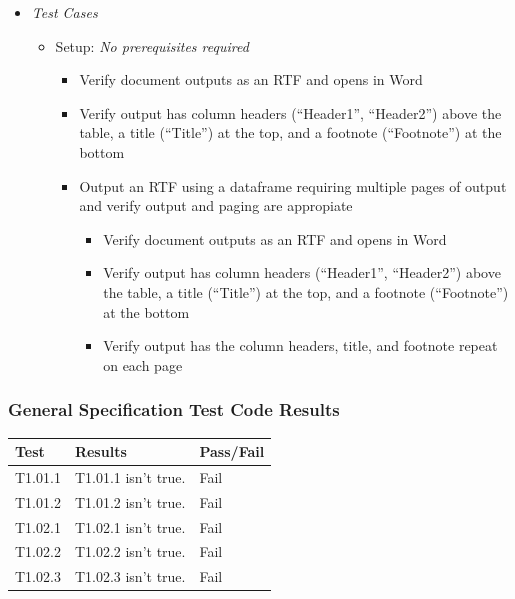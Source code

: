 \documentclass[]{article}
\providecommand{\tightlist}{%
  \setlength{\itemsep}{0pt}\setlength{\parskip}{0pt}}
\begin{document}
\begin{itemize}
\item
  \emph{Test Cases}

  \begin{itemize}
  \item
    Setup: \emph{No prerequisites required}

    \begin{itemize}
    \tightlist
    \item
      Verify document outputs as an RTF and opens in Word
    \item
      Verify output has column headers (``Header1'', ``Header2'') above
      the table, a title (``Title'') at the top, and a footnote
      (``Footnote'') at the bottom
    \item
      Output an RTF using a dataframe requiring multiple pages of output
      and verify output and paging are appropiate

      \begin{itemize}
      \tightlist
      \item
        Verify document outputs as an RTF and opens in Word
      \item
        Verify output has column headers (``Header1'', ``Header2'')
        above the table, a title (``Title'') at the top, and a footnote
        (``Footnote'') at the bottom
      \item
        Verify output has the column headers, title, and footnote repeat
        on each page
      \end{itemize}
    \end{itemize}
  \end{itemize}
\end{itemize}

\hypertarget{general-specification-test-code-results}{%
\subsubsection{General Specification Test Code
Results}\label{general-specification-test-code-results}}

\begin{table}[H]
\centering
\begin{tabular}{l|l|l}
\hline
Test & Results & Pass/Fail\\
\hline
T1.01.1 & T1.01.1 isn't true. & Fail\\
\hline
T1.01.2 & T1.01.2 isn't true. & Fail\\
\hline
T1.02.1 & T1.02.1 isn't true. & Fail\\
\hline
T1.02.2 & T1.02.2 isn't true. & Fail\\
\hline
T1.02.3 & T1.02.3 isn't true. & Fail\\
\hline
\end{tabular}
\end{table}
\end{document}
